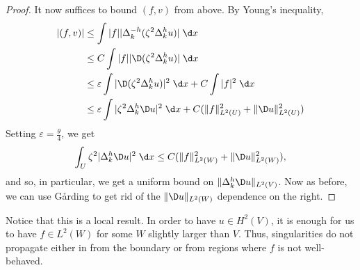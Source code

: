 \documentclass[a4paper]{article}
\begin{document}
\begin{proof}
  It now suffices to bound $(f, v)$ from above. By Young's inequality,
  \begin{align*}
    |(f, v)| &\leq \int |f| |\Delta^{-h}_k (\zeta^2 \Delta_k^h u)|\;\d x\\
    &\leq C \int |f| |\D (\zeta^2 \Delta_k^h u)|\;\d x\\
    &\leq \varepsilon \int |\D (\zeta^2 \Delta_k^h u)|^2\;\d x + C \int |f|^2\;\d x\\
    &\leq \varepsilon \int |\zeta^2 \Delta_k^h \D u|^2\;\d x + C (\|f\|_{L^2(U)}^2 + \|\D u\|_{L^2(U)}^2)
  \end{align*}
%
  Setting $\varepsilon = \frac{\theta}{4}$, we get
  \[
    \int_U \zeta^2 |\Delta_k^h \D u|^2 \;\d x \leq C (\|f\|_{L^2(W)}^2 + \|\D u\|_{L^2(W)}^2),
  \]
  and so, in particular, we get a uniform bound on $\|\Delta_k^h \D u\|_{L^2(V)}$. Now as before, we can use G\r{a}rding to get rid of the $\|\D u\|_{L^2(W)}$ dependence on the right.
\end{proof}
Notice that this is a local result. In order to have $u \in H^2(V)$, it is enough for us to have $f \in L^2(W)$ for some $W$ slightly larger than $V$. Thus, singularities do not propagate either in from the boundary or from regions where $f$ is not well-behaved.
\end{document}
